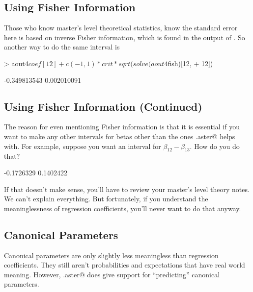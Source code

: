 \documentclass[11pt]{article}
\begin{document}
\subsection{Using Fisher Information}

Those who know master's level theoretical statistics, know the standard
error here is based on inverse Fisher information, which is found in
the output of \verb@aster@.  So another way to do the same interval is
\begin{Schunk}
\begin{Sinput}
> aout4$coef[12] + c(-1, 1) * crit * sqrt(solve(aout4$fish)[12, 
+     12])
\end{Sinput}
\begin{Soutput}
[1] -0.349813543  0.002010091
\end{Soutput}
\end{Schunk}

\subsection{Using Fisher Information (Continued)}

The reason for even mentioning Fisher information is that it is essential
if you want to make any other intervals for betas other than the ones
\verb@summary.aster@ helps with.  For example, suppose you want an interval
for $\beta_{12} - \beta_{13}$.  How do you do that?
\begin{Schunk}
\begin{Soutput}
[1] -0.1726329  0.1402422
\end{Soutput}
\end{Schunk}
If that doesn't make sense, you'll have to review your master's level theory
notes.  We can't explain everything.  But fortunately, if you understand
the meaninglessness of regression coefficients, you'll never want to do that
anyway.

\subsection{Canonical Parameters}

Canonical parameters are only slightly less meaningless than regression
coefficients.  They still aren't probabilities and expectations that have
real world meaning.  However, \verb@predict.aster@ does give support for
``predicting'' canonical parameters.
\end{document}
